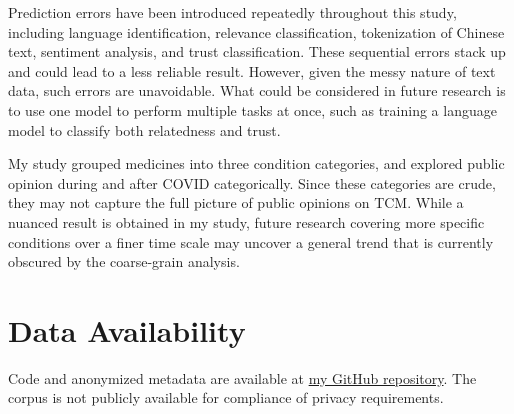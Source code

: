 \documentclass[11pt]{article}
\begin{document}
Prediction errors have been introduced repeatedly throughout this study, including language identification, relevance classification, tokenization of Chinese text, sentiment analysis, and trust classification. These sequential errors stack up and could lead to a less reliable result. However, given the messy nature of text data, such errors are unavoidable. What could be considered in future research is to use one model to perform multiple tasks at once, such as training a language model to classify both relatedness and trust.

My study grouped medicines into three condition categories, and explored public opinion during and after COVID categorically. Since these categories are crude, they may not capture the full picture of public opinions on TCM. While a nuanced result is obtained in my study, future research covering more specific conditions over a finer time scale may uncover a general trend that is currently obscured by the coarse-grain analysis.

\section{Data Availability}
Code and anonymized metadata are available at \href{https://github.com/P-mandevillei/trust\_in\_tcm\_opinion\_mining}{my GitHub repository}. The corpus is not publicly available for compliance of privacy requirements.

\clearpage
\printbibliography[heading=centeredbib, title={References}]
\end{document}

